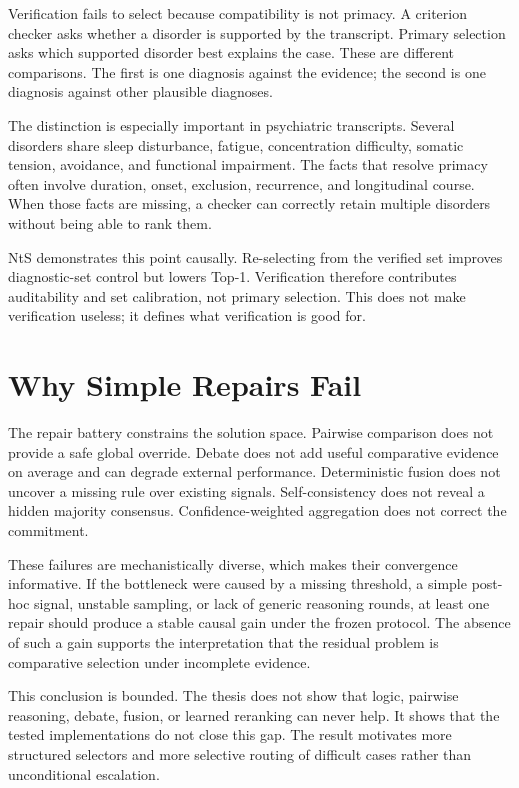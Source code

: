 Verification fails to select because compatibility is not primacy. A criterion checker asks whether a disorder is supported by the transcript. Primary selection asks which supported disorder best explains the case. These are different comparisons. The first is one diagnosis against the evidence; the second is one diagnosis against other plausible diagnoses.

The distinction is especially important in psychiatric transcripts. Several disorders share sleep disturbance, fatigue, concentration difficulty, somatic tension, avoidance, and functional impairment. The facts that resolve primacy often involve duration, onset, exclusion, recurrence, and longitudinal course. When those facts are missing, a checker can correctly retain multiple disorders without being able to rank them.

NtS demonstrates this point causally. Re-selecting from the verified set improves diagnostic-set control but lowers Top-1. Verification therefore contributes auditability and set calibration, not primary selection. This does not make verification useless; it defines what verification is good for.

\section{Why Simple Repairs Fail}

The repair battery constrains the solution space. Pairwise comparison does not provide a safe global override. Debate does not add useful comparative evidence on average and can degrade external performance. Deterministic fusion does not uncover a missing rule over existing signals. Self-consistency does not reveal a hidden majority consensus. Confidence-weighted aggregation does not correct the commitment.

These failures are mechanistically diverse, which makes their convergence informative. If the bottleneck were caused by a missing threshold, a simple post-hoc signal, unstable sampling, or lack of generic reasoning rounds, at least one repair should produce a stable causal gain under the frozen protocol. The absence of such a gain supports the interpretation that the residual problem is comparative selection under incomplete evidence.

This conclusion is bounded. The thesis does not show that logic, pairwise reasoning, debate, fusion, or learned reranking can never help. It shows that the tested implementations do not close this gap. The result motivates more structured selectors and more selective routing of difficult cases rather than unconditional escalation.

